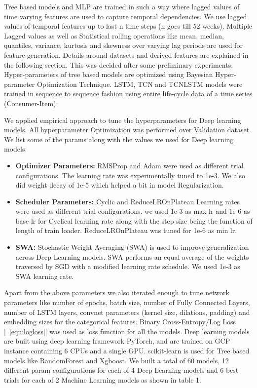 Tree based models and MLP are trained in such a way where lagged values of time varying features are used
to capture temporal dependencies. We use lagged values of temporal features up to last n time steps (n goes till 52 weeks).
Multiple Lagged values as well as Statistical rolling operations like mean, median, quantiles, variance, kurtosis and 
skewness over varying lag periods are used for feature generation. Details around datasets and derived features are explained 
in the following section. This was decided after some preliminary experiments. Hyper-parameters of tree based models are optimized
using Bayesian Hyper-parameter Optimization Technique. LSTM, TCN and TCNLSTM models were trained in sequence to sequence 
fashion using entire life-cycle data of a time series (Consumer-Item).

We applied empirical approach to tune the hyperparameters for Deep learning models. All hyperparameter Optimization
was performed over Validation dataset. We list some of the params along with the values we used for Deep learning models.
  \begin{itemize}
    \item {\bf Optimizer Parameters:} RMSProp and Adam were used as different trial configurations. The learning rate 
    was experimentally tuned to 1e-3. We also did weight decay of 1e-5 which helped a bit in model Regularization.
    \item {\bf Scheduler Parameters:} Cyclic and ReduceLROnPlateau Learning rates were used as different trial configurations.
    we used 1e-3 as max lr and 1e-6 as base lr for Cyclical learning rate along with the step size being the function of
    length of train loader. ReduceLROnPlateau was tuned for 1e-6 as min lr.
    \item {\bf SWA:} Stochastic Weight Averaging (SWA) is used to improve generalization across Deep Learning
    models. SWA performs an equal average of the weights traversed by SGD with a modified learning rate schedule. We used 
    1e-3 as SWA learning rate.
  \end{itemize}
Apart from the above parameters we also iterated enough to tune network parameters like number of epochs, batch size, 
number of Fully Connected Layers, number of LSTM layers, convnet parameters (kernel size, dilations, padding)
and embedding sizes for the categorical features. Binary Cross-Entropy/Log Loss [~\ref{eqn:logloss}] was used as loss 
function for all the models. Deep learning models are built using deep learning framework
PyTorch, and are trained on GCP instance containing 6 CPUs and a single GPU. scikit-learn is used for Tree
based models like RandomForest and Xgboost. We built a total of 60 models, 12 different param configurations for each of 4 
Deep Learning models and 6 best trials for each of 2 Machine Learning models as shown in table 1.

